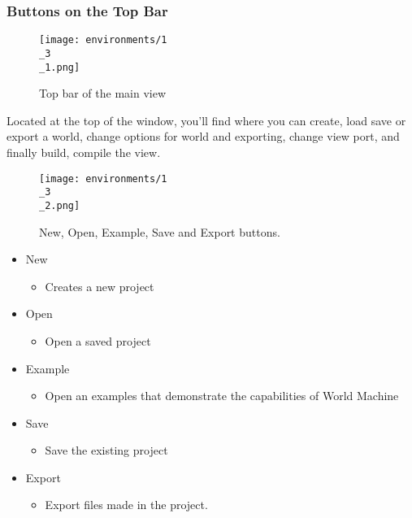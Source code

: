 \documentclass[../main.tex]{subfiles}
\begin{document}
\subsubsection{Buttons on the Top Bar}
\begin{figure}[H]
\texttt{[image: environments/1\\\_3\\\_1.png]}
\caption{Top bar of the main view}
\end{figure}
Located at the top of the window, you’ll find where you can create, load save or export a world, change options for world and exporting, change view port, and finally build, compile the view.
\begin{figure}[H]
\texttt{[image: environments/1\\\_3\\\_2.png]}
\caption{New, Open, Example, Save and Export buttons.}
\end{figure}
\begin{itemize}
    \item New
        \begin{itemize}
            \item Creates a new project
        \end{itemize}
    \item Open
        \begin{itemize}
            \item Open a saved project
        \end{itemize}
    \item Example
        \begin{itemize}
            \item Open an examples that demonstrate the capabilities of World Machine
        \end{itemize}
    \item Save
        \begin{itemize}
            \item Save the existing project
        \end{itemize}
    \item Export
        \begin{itemize}
            \item Export files made in the project.
        \end{itemize}
\end{itemize}
\end{document}
